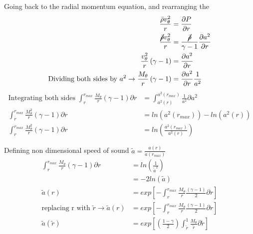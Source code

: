 Going back to the radial momentum equation, and rearranging the 
\begin{align*}
\frac{\bar{\rho} v_{\theta}^2}{r} 
&=\frac{\partial P}{\partial r}\\
\frac{\cancel{\bar{\rho}} v_{\theta}^2}{r} 
&=\frac{\cancel{\bar{\rho}}}{\gamma -1}\frac{\partial a^2}{\partial r}\\
\frac{v_{\theta}^2}{r}\left(\gamma -1\right) &= \frac{\partial a^2}{\partial r}\\ \text{Dividing both sides by } a^2 \rightarrow \frac{M_{\theta}}{r}\left(\gamma - 1\right) &= \frac{\partial a^2}{\partial r} \frac{1}{a^2}
\end{align*}
\begin{align*}
\text{Integrating both sides } \int_{r}^{r_{max}}\frac{M_{\theta}}{r}\left(\gamma - 1\right){\partial r}  &=\int_{a^2(r)}^{a^2(r_{max})}\frac{1}{a^2}  {\partial a^2}\\
\int_{r}^{r_{max}}\frac{M^2_{\theta}}{r}\left(\gamma - 1\right){\partial r}  &=ln(a^2(r_{max})) - ln(a^2(r)) \\
\int_{r}^{r_{max}}\frac{M^2_{\theta}}{r}\left(\gamma - 1\right){\partial r}  &=ln\left(\frac{a^2(r_{max})}{a^2(r)}\right) 
\end{align*}

Defining non dimensional speed of sound $\tilde{a} = \frac{a(r)}{a(r_{max})}$
\begin{align*}
\int_{r}^{r_{max}}\frac{M_{\theta}}{r}\left(\gamma - 1\right){\partial r}  &=ln\left(\frac{1}{\tilde{a}^2}\right) \\
&= -2ln(\tilde{a})\\
\tilde{a}(r) &= exp\left[-\int_{r}^{r_{max}}\frac{M_{\theta}}{r}\frac{\left(\gamma - 1\right)}{2}{\partial r}\right] \\ \text{replacing r with }\tilde{r} \rightarrow \tilde{a}(r) &= exp\left[-\int_{r}^{r_{max}}\frac{M_{\theta}}{r}\frac{\left(\gamma - 1\right)}{2}{\partial r}\right]		\\
\tilde{a}(\tilde{r}) &= exp\left[\left(\frac{1 - \gamma}{2}\right)\int_{\tilde{r}}^{1}\frac{M_{\theta}}{\tilde{r}}{\partial \tilde{r}}\right]	
\end{align*}
